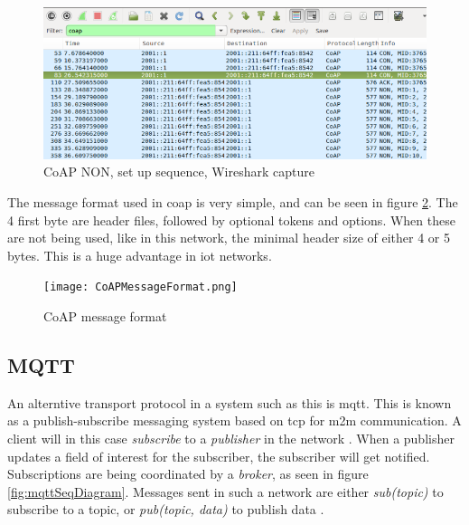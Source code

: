 \begin{figure}[ht]
    \centering
    \includegraphics[width=1.0\textwidth]{coapCONwiresharksetUpSequence.png}    
    \caption{CoAP NON, set up sequence, Wireshark capture}
    \label{fig:CoAPNONwiresharkSetUp}
\end{figure}


\noindent The message format used in \gls{coap} is very simple, and can be seen in figure \ref{fig:CoAPMessageFormat}. The 4 first byte are header files, followed by optional tokens and options. When these are not being used, like in this network, the minimal header size of either 4 or 5 bytes. This is a huge advantage in \gls{iot} networks.


\begin{figure}[ht]
    \centering
    \texttt{[image: CoAPMessageFormat.png]}    
    \caption{CoAP message format}
    \label{fig:CoAPMessageFormat}
\end{figure}






\subsection{MQTT}

\noindent An alterntive transport protocol in a system such as this is \gls{mqtt}. This is  known as a publish-subscribe messaging system based on \gls{tcp} for \gls{m2m} communication. A client will in this case \textit{subscribe} to a \textit{publisher} in the network \cite{hunkeler2008mqtt}. When a publisher updates a field of interest for the subscriber, the subscriber will get notified. Subscriptions are being coordinated by a \textit{broker}, as seen in figure \ref{fig:mqttSeqDiagram}. Messages sent in such a network are either \textit{sub(topic)} to subscribe to a topic, or \textit{pub(topic, data)} to publish data \cite{mqttWebsite}. 


